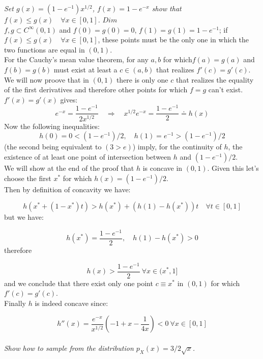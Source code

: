 \documentclass[10pt,a4paper]{report}
\author{D. Doimo}
\begin{document}
\textit{Set $g(x)=(1-e^{-1})x^{1/2}$, $f(x)=1-e^{-x}$ show that $f(x) \leq g(x) \quad \forall x\in[0,1]$.\vspace{5mm}}
$Dim$\\
$f,g \subset C^{\infty}(0,1)$ and $f(0)=g(0)=0$,  $f(1)=g(1)=1-e^{-1}$; if $f(x) \leq g(x) \quad \forall x\in[0,1]$, these points must be the only one in which the two functions are equal in $(0,1)$. \\
For the Cauchy's mean value theorem, for any ${a,b}$ for which$f(a)=g(a)$ and $f(b)=g(b)$ must exist at least a $c\in(a,b)$ that realizes $f'(c)=g'(c)$. We will now proove that in $(0,1)$ there is only one $c$ that realizes the equality of the first derivatives and therefore other points for which $f=g$ can't exist.\\
$f'(x)=g'(x)$ gives:
\begin{equation}
e^{-x}=\dfrac{1-e^{-1}}{2x^{1/2}}\quad \Rightarrow \quad x^{1/2}e^{-x}=\dfrac{1-e^{-1}}{2}\doteq h(x)
\end{equation}
Now the following inequalities:
\begin{equation}
h(0)=0<(1-e^{-1})/2, \quad h(1)=e^{-1}>(1-e^{-1})/2
\end{equation}
(the second being equivalent to $(3>e)$) imply, for the continuity of $h$, the existence of at least one point of intersection between $h$ and $(1-e^{-1})/2$.\\
We will show at the end of the proof that $h$ is concave in $(0,1)$. Given this let's choose the first $x^{*}$ for which $h(x)=(1-e^{-1})/2$. \\
Then by definition of concavity we have:

\begin{equation}
h(x^{*}+(1-x^{*})t)> h(x^{*})+(h(1)-h(x^{*}))t \quad \forall t \in [0,1]
\end{equation}
but we have:

\begin{equation}
h(x^{*})=\dfrac{1-e^{-1}}{2}, \quad h(1)-h(x^{*})>0
\end{equation}
therefore

\begin{equation}
h(x)>\dfrac{1-e^{-1}}{2} \ \forall x \in(x^{*},1]
\end{equation}
and we conclude that there exist only one point $c\equiv x^{*}$ in $(0,1)$ for which $f'(c)=g'(c)$.\\

Finally $h$ is indeed concave since:

\begin{equation}
h''(x)=\dfrac{e^{-x}}{x^{1/2}}\left(-1+x-\dfrac{1}{4x}\right)<0 \ \forall x\in[0,1]
\end{equation} 
\\
\textit{Show how to sample from the distribution $p_{X}(x)=3/2\sqrt{x}$.}\\
\end{document}
